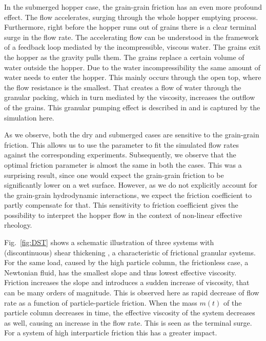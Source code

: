 \documentclass[twoside,twocolumn,9pt]{article}
\begin{document}
In the submerged hopper case, the grain-grain friction has an even more profound effect. The 
flow accelerates, surging through the whole hopper emptying process. Furthermore, 
right before the hopper runs out of grains there is a clear terminal surge in the flow rate. The
accelerating flow can be understood in the framework of a feedback loop mediated by the
incompressible, viscous water. The grains exit the hopper as the gravity pulls them. 
The grains replace a certain volume of water outside the hopper. Due to 
the water incompressibility the same amount of water needs to enter the hopper. This mainly
occurs through the open top, where the flow resistance is the smallest. That creates a flow of
water through the granular packing, which in turn mediated by the viscosity, increases the outflow of the
grains. This granular pumping effect is described in \cite{koivistoSubmitted} and is captured by the 
simulation here. 

As we observe, both the dry and submerged cases are sensitive to the grain-grain friction.
This allows us to use the parameter to fit the simulated flow rates against the corresponding 
experiments. Subsequently, we observe that the optimal friction parameter is almost
the same in both the cases. This was a surprising result, since one would expect the grain-grain
friction to be significantly lower on a wet surface. However, as we do not explicitly account for the grain-grain hydrodynamic interactions, we expect the
friction coefficient to partly compensate for that. This sensitivity to friction coefficient gives
the possibility to interpret the hopper flow in the context of non-linear effective rheology.

Fig.~\ref{fig:DST} shows a schematic illustration of three systems with (discontinuous) shear thickening \cite{Peters2016}, a characteristic of frictional granular systems. For the same load, caused by the high particle column, the frictionless case, a Newtonian fluid, has the smallest slope and thus lowest effective viscosity. Friction increases the slope and introduces a sudden increase of viscosity, that can be many orders of magnitude. This is observed here as rapid decrease of flow rate as a function of particle-particle friction.
When the mass $m(t)$ of the particle column decreases in time, the effective viscosity of the system decreases as well, causing an increase in the flow rate. This is seen as the terminal surge. For a system of high interparticle friction this has a greater impact.
\end{document}
